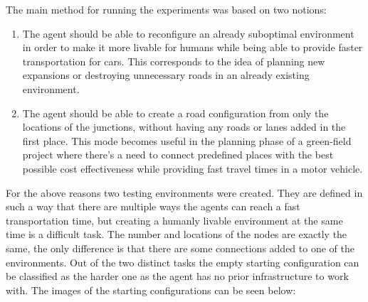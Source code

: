 \documentclass[
]{elteikthesis}[2023/04/10]
\begin{document}
The main method for running the experiments was based on two notions: 
\begin{enumerate}
\item The agent should be able to reconfigure an already suboptimal environment
in order to make it more livable for humans while being able to provide
faster transportation for cars. This corresponds to the idea of planning
new expansions or destroying unnecessary roads in an already existing
environment.
\item The agent should be able to create a road configuration from only
the locations of the junctions, without having any roads or lanes
added in the first place. This mode becomes useful in the planning
phase of a green-field project where there's a need to connect predefined
places with the best possible cost effectiveness while providing fast
travel times in a motor vehicle. 
\end{enumerate}
For the above reasons two testing environments were created. They
are defined in such a way that there are multiple ways the agents
can reach a fast transportation time, but creating a humanly livable
environment at the same time is a difficult task. The number and locations
of the nodes are exactly the same, the only difference is that there
are some connections added to one of the environments. Out of the
two distinct tasks the empty starting configuration can be classified
as the harder one as the agent has no prior infrastructure to work
with. The images of the starting configurations can be seen below: 
\end{document}
